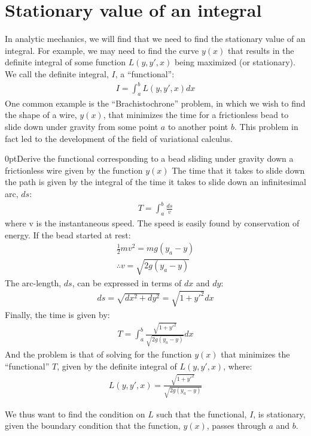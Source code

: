 \section{Stationary value of an integral}
In analytic mechanics, we will find that we need to find the stationary value of an integral. For example, we may need to find the curve $y(x)$ that results in the definite integral of some function $L(y,y',x)$ being maximized (or stationary). We call the definite integral, $I$, a ``functional'':
\begin{align}
I = \int_a^b L(y,y',x)dx
\end{align}
One common example is the ``Brachistochrone'' problem, in which we wish to find the shape of a wire, $y(x)$, that minimizes the time for a frictionless bead to slide down under gravity from some point $a$ to another point $b$. This problem in fact led to the development of the field of variational calculus.
\begin{example}{0pt}{Derive the functional corresponding to a bead sliding under gravity down a frictionless wire given by the function $y(x)$}{}
The time that it takes to slide down the path is given by the integral of the time it takes to slide down an infinitesimal arc, $ds$:
\begin{align*}
T=\int_a^b \frac{ds}{v}
\end{align*}
where v is the instantaneous speed. The speed is easily found by conservation of energy. If the bead started at rest:
\begin{align*}
\frac{1}{2}mv^2=mg(y_a-y)\nonumber\\
\therefore v =\sqrt{2g(y_a-y)}
\end{align*}
The arc-length, $ds$, can be expressed in terms of $dx$ and $dy$:
\begin{align*}
ds=\sqrt{dx^2+dy^2}=\sqrt{1+y'^2}dx
\end{align*}
Finally, the time is given by:
\begin{align*}
T=\int_a^b \frac{\sqrt{1+y'^2}}{\sqrt{2g(y_a-y)}}dx
\end{align*}
And the problem is that of solving for the function $y(x)$ that minimizes the ``functional'' $T$, given by the definite integral of $L(y,y',x)$, where:
\begin{align*}
L(y,y',x)=\frac{\sqrt{1+y'^2}}{\sqrt{2g(y_a-y)}}
\end{align*}
\label{ex:brach}
\end{example}
\noindent
We thus want to find the condition on $L$ such that the functional, $I$, is stationary, given the boundary condition that the function, $y(x)$, passes through $a$ and $b$.

